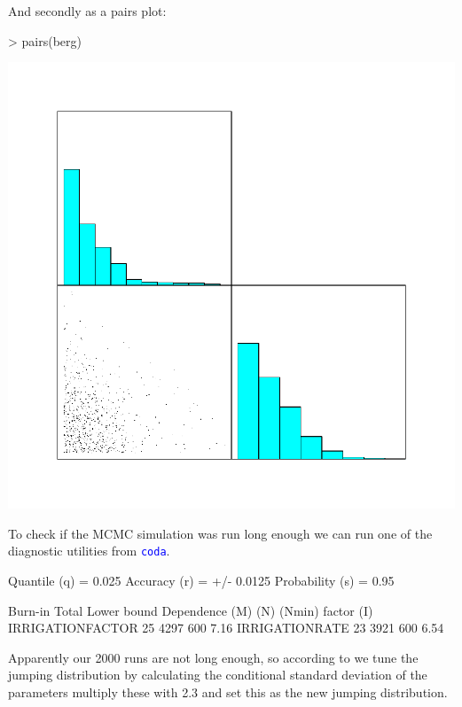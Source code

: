 \documentclass{scrartcl}
\newcommand{\Rcode}[1]{\texttt{\textcolor{blue}{#1}}}
\begin{document}
And secondly as a pairs plot: 

\begin{Schunk}
\begin{Sinput}
> pairs(berg)
\end{Sinput}
\end{Schunk}
\includegraphics{figures/f-pairsbay}

To check if the MCMC simulation was run long enough we can run one of
the diagnostic utilities from \Rcode{coda}. 

\begin{Schunk}
\begin{Soutput}
Quantile (q) = 0.025
Accuracy (r) = +/- 0.0125
Probability (s) = 0.95 
                                                        
                  Burn-in  Total Lower bound  Dependence
                  (M)      (N)   (Nmin)       factor (I)
 IRRIGATIONFACTOR 25       4297  600          7.16      
 IRRIGATIONRATE   23       3921  600          6.54      
\end{Soutput}
\end{Schunk}
Apparently our 2000 runs are not long enough, so according to
\citet{raftery96} we tune the jumping distribution by calculating the
conditional standard deviation of the parameters multiply these with
2.3 and set this as the new jumping distribution.
\end{document}
